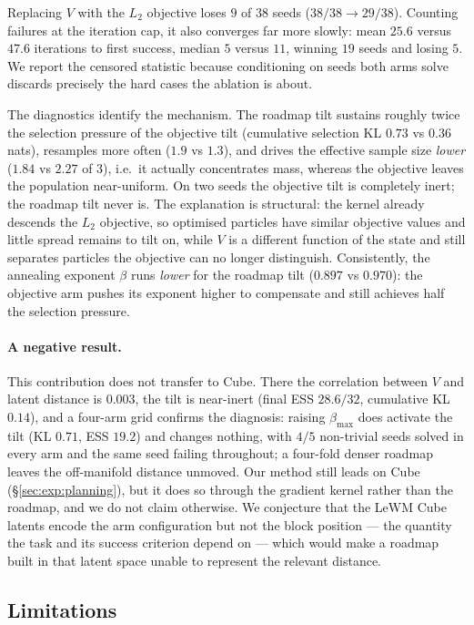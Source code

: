 Replacing $V$ with the $L_2$ objective loses $9$ of $38$ seeds ($38/38 \to
29/38$). Counting failures at the iteration cap, it also converges far more
slowly: mean $25.6$ versus $47.6$ iterations to first success, median $5$ versus
$11$, winning $19$ seeds and losing $5$. We report the censored statistic
because conditioning on seeds both arms solve discards precisely the hard cases
the ablation is about.

The diagnostics identify the mechanism. The roadmap tilt sustains roughly twice
the selection pressure of the objective tilt (cumulative selection KL $0.73$ vs
$0.36$ nats), resamples more often ($1.9$ vs $1.3$), and drives the effective
sample size \emph{lower} ($1.84$ vs $2.27$ of $3$), i.e.\ it actually
concentrates mass, whereas the objective leaves the population near-uniform. On
two seeds the objective tilt is completely inert; the roadmap tilt never is.
The explanation is structural: the kernel already descends the $L_2$ objective,
so optimised particles have similar objective values and little spread remains
to tilt on, while $V$ is a different function of the state and still separates
particles the objective can no longer distinguish. Consistently, the annealing
exponent $\beta$ runs \emph{lower} for the roadmap tilt ($0.897$ vs $0.970$):
the objective arm pushes its exponent higher to compensate and still achieves
half the selection pressure.

\paragraph{A negative result.}
This contribution does not transfer to Cube. There the correlation between $V$
and latent distance is $0.003$, the tilt is near-inert (final ESS $28.6/32$,
cumulative KL $0.14$), and a four-arm grid confirms the diagnosis: raising
$\beta_{\max}$ does activate the tilt (KL $0.71$, ESS $19.2$) and changes
nothing, with $4/5$ non-trivial seeds solved in every arm and the same seed
failing throughout; a four-fold denser roadmap leaves the off-manifold distance
unmoved. Our method still leads on Cube (\S\ref{sec:exp:planning}), but it does
so through the gradient kernel rather than the roadmap, and we do not claim
otherwise. We conjecture that the LeWM Cube latents encode the arm
configuration but not the block position --- the quantity the task and its
success criterion depend on --- which would make a roadmap built in that latent
space unable to represent the relevant distance.

\subsection{Limitations}
\label{sec:exp:limits}

